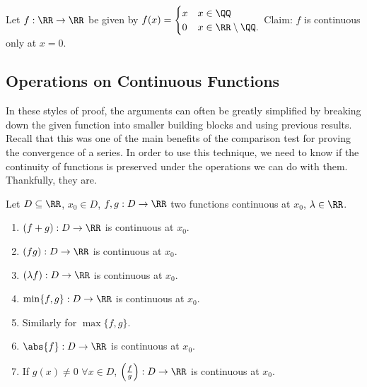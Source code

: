 \documentclass[../real_analysis.tex]{subfiles}
\begin{document}
            \begin{example}
                Let $f: \RR\to\RR$ be given by $f(x)=\begin{cases}
                    x & x\in\QQ\\
                    0 & x\in\RR\setminus\QQ.
                \end{cases}$ Claim: $f$ is continuous only at $x=0$.
            \end{example}

        \subsection{Operations on Continuous Functions}\label{subsec:operations-on-continuous-functions}
            In these styles of proof, the arguments can often be greatly simplified by breaking down the given function into smaller building blocks and using previous results. Recall that this was one of the main benefits of the comparison test for proving the convergence of a series. In order to use this technique, we need to know if the continuity of functions is preserved under the operations we can do with them. Thankfully, they are.
            \begin{theorem}\label{thm:cts-func-props}
                Let $D\subseteq\RR$, $x_0\in D$, $f, g: D\to\RR$ two functions continuous at $x_0$, $\lambda\in\RR$.
                \begin{enumerate}[label={\upshape(\roman*)}]
                    \item $(f+g): D\to\RR$ is continuous at $x_0$.
                    \item $(fg): D\to\RR$ is continuous at $x_0$.
                    \item $(\lambda f): D\to\RR$ is continuous at $x_0$.
                    \item $\min\{f, g\}: D\to\RR$ is continuous at $x_0$.
                    \item Similarly for $\max\{f, g\}$.
                    \item $\abs{f}: D\to\RR$ is continuous at $x_0$.
                    \item If $g(x)\neq0$ $\forall x\in D$, $\left(\frac{f}{g}\right): D\to\RR$ is continuous at $x_0$.
                \end{enumerate}
            \end{theorem}
\end{document}
